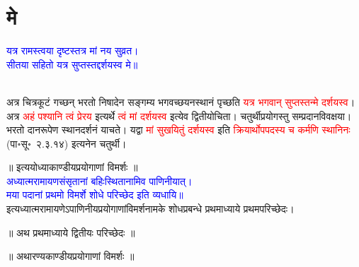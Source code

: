 \section[मे]{मे}
\centering\textcolor{blue}{यत्र रामस्त्वया दृष्टस्तत्र मां नय सुव्रत।\nopagebreak\\
सीतया सहितो यत्र सुप्तस्तद्दर्शयस्व मे॥}\nopagebreak\\
\\
\begin{sloppypar}\justifying\noindent\hspace{10mm} अत्र चित्रकूटं गच्छन् भरतो निषादेन सङ्गम्य भगवच्छयन\-स्थानं पृच्छति \textcolor{red}{यत्र भगवान् सुप्तस्तन्मे दर्शयस्व}। अत्र \textcolor{red}{अहं पश्यानि त्वं प्रेरय} इत्यर्थे \textcolor{red}{त्वं मां दर्शयस्व} इत्येव द्वितीयोचिता। चतुर्थी\-प्रयोगस्तु सम्प्रदान\-विवक्षया। भरतो दान\-रूपेण स्थान\-दर्शनं याचते। यद्वा \textcolor{red}{मां सुखयितुं दर्शयस्व} इति \textcolor{red}{क्रियार्थोपपदस्य च कर्मणि स्थानिनः} (पा॰सू॰~२.३.१४) इत्यनेन चतुर्थी।\end{sloppypar}
\vspace{2mm}
\centering ॥ इत्ययोध्याकाण्डीयप्रयोगाणां विमर्शः ॥\nopagebreak\\
\vspace{4mm}
\centering\textcolor{blue}{\fontsize{16}{24}\selectfont अध्यात्मरामायणसंसृतानां बहिःस्थितानामिव पाणिनीयात्।\nopagebreak\\
मया पदानां प्रथमो विमर्शे शोधे परिच्छेद इति व्यधायि॥}\nopagebreak\\
\vspace{4mm}
\centering इत्यध्यात्म\-रामायणेऽपाणिनीय\-प्रयोगाणां\-विमर्श\-नामके शोध\-प्रबन्धे प्रथमाध्याये प्रथम\-परिच्छेदः।\\
\pagebreak
{}
{}
\centering ॥ अथ प्रथमाध्याये द्वितीयः परिच्छेदः ॥\nopagebreak\\
\vspace{4mm}
{}
\centering ॥ अथारण्यकाण्डीयप्रयोगाणां विमर्शः ॥\nopagebreak\\
